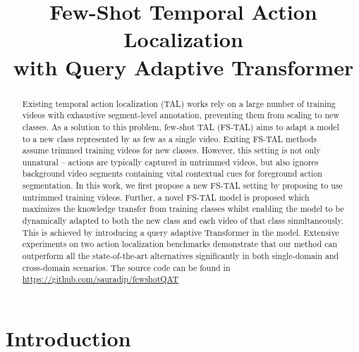 \documentclass{bmvc2k}
\title{Few-Shot Temporal Action Localization  \\ with Query Adaptive Transformer}
\begin{document}
\maketitle

\begin{abstract}
Existing temporal action localization (TAL) works rely on  a  large  number  of  training  videos  with  exhaustive segment-level annotation, preventing them from scaling to new classes.   As a solution to this problem,  few-shot TAL (FS-TAL) aims to adapt a model to a new class represented by as few as a single video. Exiting FS-TAL methods assume trimmed training videos for new classes. However, this setting is not only unnatural – actions are typically captured in untrimmed videos, but also ignores background video segments containing vital contextual cues for foreground action segmentation. In this work, we first propose a new FS-TAL setting by proposing to use untrimmed training videos. Further,  a  novel  FS-TAL  model  is  proposed  which  maximizes the knowledge transfer from training classes whilst enabling the model to be dynamically adapted to both the new class and each video of that class simultaneously. This is  achieved  by  introducing  a  query  adaptive  Transformer in the model. Extensive experiments on two action localization benchmarks demonstrate that our method can outperform all the state-of-the-art alternatives significantly in both single-domain and cross-domain scenarios. The source code can be found in \href{https://github.com/sauradip/fewshotQAT}{https://github.com/sauradip/fewshotQAT}
\end{abstract}

\section{Introduction}
\end{document}
